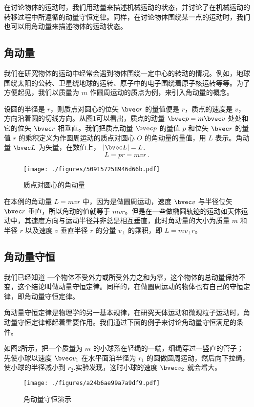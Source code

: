 
\begin{issues}
\issueTODO
\end{issues}

在讨论物体的运动时，我们用动量来描述机械运动的状态，并讨论了在机械运动的转移过程中所遵循的动量守恒定律。同样，在讨论物体围绕某一点的运动时，我们也可以用角动量来描述物体的运动状态。
\subsection{角动量}
我们在研究物体的运动中经常会遇到物体围绕一定中心的转动的情况。例如，地球围绕太阳的公转、卫星绕地球的运转、原子中的电子围绕着原子核运转等等。为了方便起见，我们以质量为 $m$ 作圆周运动的质点为例，来引入角动量的概念。

设圆的半径是 $r$，则质点对圆心的位矢 $\bvec r$ 的量值便是 $r$，质点的速度是 $v$，方向沿着圆的切线方向。从图1可以看出，质点的动量 $\bvec p = m\bvec v$ 处处和它的位矢 $\bvec r$ 相垂直。我们把质点动量 $\bvec p$ 的量值 $p$ 和位矢 $\bvec r$ 的量值 $r$ 的乘积定义为作圆周运动的质点对圆心 $O$ 的角动量的量值，用 $L$ 表示。角动量 $\bvec L$ 为矢量，在数值上， $|\bvec L| = L$.
\begin{equation}
L = pr = mvr~.
\end{equation}
\begin{figure}[ht]
\centering
\texttt{[image: ./figures/509157258946d66b.pdf]}
\caption{质点对圆心的角动量} \label{fig_AngMo_1}
\end{figure}

在本例的角动量 $L=mvr$ 中，因为是做圆周运动，速度 $\bvec v$ 与半径位矢 $\bvec r$ 垂直，所以角动的值就等于 $mvr$。但是在一些做椭圆轨迹的运动如天体运动中，其速度方向与运动半径并非总是相互垂直，此时角动量的大小为质量 $m$ 和半径 $r$ 以及速度 $v$ 垂直半径 $r$ 的分量 $v_{\perp}$ 的乘积，即 $L=m v_{\perp}r$。
\subsection{角动量守恒}
我们已经知道 一个物体不受外力或所受外力之和为零，这个物体的总动量保持不变，这个结论叫做动量守恒定律。同样的，在做圆周运动的物体也有自己的守恒定律，即角动量守恒定律。

角动量守恒定律是物理学的另一基本规律，在研究天体运动和微观粒子运动时，角动量守恒定律都起着重要作用。我们通过下面的例子来讨论角动量守恒满足的条件。

如图2所示，把一个质量为 $m$ 的小球系在轻绳的一端，细绳穿过一竖直的管子；先使小球以速度 $\bvec v_1$ 在水平面沿半径为 $r_1$ 的圆做圆周运动，然后向下拉绳，使小球的半径减小到 $r_2$.实验发现，这时小球的速度 $\bvec v_2$ 就会增大。
\begin{figure}[ht]
\centering
\texttt{[image: ./figures/a24b6ae99a7a9df9.pdf]}
\caption{角动量守恒演示} \label{fig_AngMo_2}
\end{figure}

